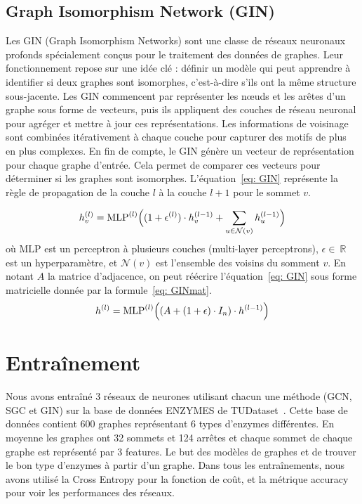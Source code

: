 \documentclass[a4paper]{article}
\begin{document}
\subsection{Graph Isomorphism Network (GIN)}

Les GIN (Graph Isomorphism Networks) sont une classe de réseaux neuronaux profonds spécialement conçus pour le traitement des données de graphes. Leur fonctionnement repose sur une idée clé : définir un modèle qui peut apprendre à identifier si deux graphes sont isomorphes, c'est-à-dire s'ils ont la même structure sous-jacente. Les GIN commencent par représenter les nœuds et les arêtes d'un graphe sous forme de vecteurs, puis ils appliquent des couches de réseau neuronal pour agréger et mettre à jour ces représentations. Les informations de voisinage sont combinées itérativement à chaque couche pour capturer des motifs de plus en plus complexes. En fin de compte, le GIN génère un vecteur de représentation pour chaque graphe d'entrée. Cela permet de comparer ces vecteurs pour déterminer si les graphes sont isomorphes. L'équation~\ref{eq: GIN} représente la règle de
propagation de la couche $l$ à la couche $l+1$ pour le sommet $v$.

\begin{equation}
    h_v^{(l)} = \text{MLP}^{(l)} \Bigl((1+\epsilon^{(l)}) \cdot h_v^{(l-1)}+\sum_{u\in \mathcal{N}(v)}h_u^{(l-1)}\Bigl)
    \label{eq: GIN}
\end{equation}
où $\text{MLP}$ est un perceptron à plusieurs couches (multi-layer perceptrons), $\epsilon \in~\mathbb{R}$ est un hyperparamètre, et $\mathcal{N}(v)$ est l'ensemble des voisins du somment $v$. En notant $A$ la matrice d'adjacence, on peut réécrire l'équation~\ref{eq: GIN} sous forme matricielle donnée par la formule~\ref{eq: GINmat}.
\begin{equation}
    h^{(l)} = \text{MLP}^{(l)} \Bigl(( A + (1+\epsilon) \cdot I_n)\cdot h^{(l-1)} \Bigl)
    \label{eq: GINmat}
\end{equation}

\section{Entraînement}
Nous avons entraîné 3 réseaux de neurones utilisant chacun une méthode (GCN, SGC et GIN) sur la base de données ENZYMES de TUDataset~\cite{Morris+2020}. Cette base de données contient 600 graphes représentant 6 types d'enzymes différentes. En moyenne les graphes ont 32 sommets et 124 arrêtes et chaque sommet de chaque graphe est représenté par 3 features. Le but des modèles de graphes et de trouver le bon type d'enzymes à partir d'un graphe. Dans tous les entraînements, nous avons utilisé la Cross Entropy pour la fonction de coût, et la métrique accuracy pour voir les performances des réseaux.
\end{document}
